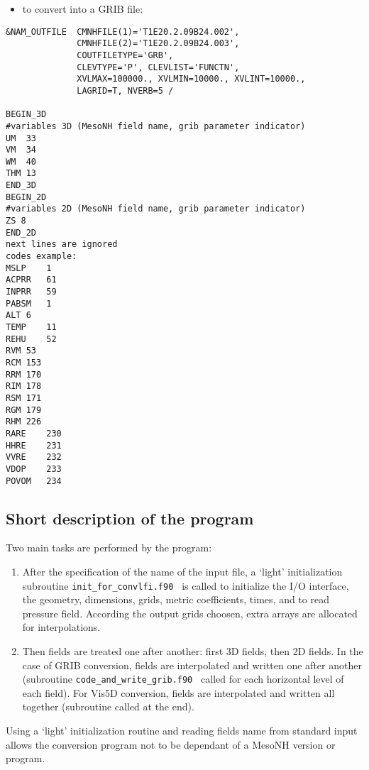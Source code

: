 \begin{itemize}
\item
to convert into a GRIB file:
\end{itemize}
\begin{verbatim}
&NAM_OUTFILE  CMNHFILE(1)='T1E20.2.09B24.002',
              CMNHFILE(2)='T1E20.2.09B24.003',
              COUTFILETYPE='GRB', 
              CLEVTYPE='P', CLEVLIST='FUNCTN',
              XVLMAX=100000., XVLMIN=10000., XVLINT=10000.,
              LAGRID=T, NVERB=5 /

BEGIN_3D
#variables 3D (MesoNH field name, grib parameter indicator)
UM  33
VM  34
WM  40
THM 13
END_3D
BEGIN_2D
#variables 2D (MesoNH field name, grib parameter indicator)
ZS 8
END_2D
next lines are ignored
codes example:
MSLP    1  
ACPRR   61 
INPRR   59 
PABSM   1
ALT 6
TEMP    11
REHU    52
RVM 53
RCM 153
RRM 170
RIM 178
RSM 171
RGM 179
RHM 226
RARE    230
HHRE    231
VVRE    232
VDOP    233
POVOM   234
\end{verbatim}


\normalsize
\subsection{Short description of the program}
Two main tasks are performed by the program: 
\begin{enumerate}
 \item \subitem After the specification of the name of the input file, a `light'
initialization subroutine {\tt init\_for\_convlfi.f90 } is called to initialize
the I/O interface, the geometry, dimensions, grids, metric coefficients, times,
and to read pressure field.
 \subitem According the output grids choosen, extra arrays are allocated for 
interpolations. 
 \item Then fields are treated one after another: first 3D fields, then 
2D fields. 
 \subitem In the case of GRIB conversion, fields are interpolated and written
one after another (subroutine {\tt code\_and\_write\_grib.f90 } called for each
horizontal level of each field). 
 \subitem For Vis5D conversion, fields are interpolated and written
all together (subroutine  called at the end).
\end{enumerate}
Using a `light' initialization routine and reading fields name from standard
input allows the conversion program not to be dependant of a MesoNH version 
or program.


